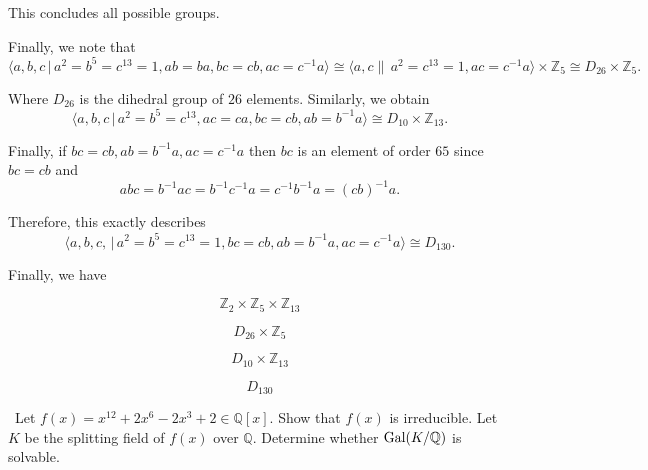 \documentclass[12pt]{Qual}
\begin{document}
\begin{solution}
This concludes all possible groups.

Finally, we note that
    $$\langle a,b,c\,|\,a^2=b^5=c^{13}=1,ab=ba,bc=cb,ac=c^{-1}a\rangle\cong\langle a,c\|\,a^2=c^{13}=1,ac=c^{-1}a\rangle\times\mathbb{Z}_5\cong D_{26}\times\mathbb{Z}_5.$$

    Where $D_{26}$ is the dihedral group of $26$ elements. Similarly, we obtain   $$\langle a,b,c\,|\,a^2=b^5=c^{13},ac=ca,bc=cb,ab=b^{-1}a\rangle\cong D_{10}\times\mathbb{Z}_{13}.$$

    Finally, if $bc=cb,ab=b^{-1}a,ac=c^{-1}a$ then $bc$ is an element of order $65$ since $bc=cb$ and $$abc=b^{-1}ac=b^{-1}c^{-1}a=c^{-1}b^{-1}a=(cb)^{-1}a.$$

    Therefore, this exactly describes $$\langle a,b,c,\,|\,a^2=b^5=c^{13}=1,bc=cb,ab=b^{-1}a,ac=c^{-1}a\rangle\cong D_{130}.$$

    Finally, we have

\begin{center}
    \begin{framed}

    $$\mathbb{Z}_2\times\mathbb{Z}_5\times\mathbb{Z}_{13}$$

    $$D_{26}\times\mathbb{Z}_5$$

    $$D_{10}\times\mathbb{Z}_{13}$$

    $$D_{130}$$

    \end{framed}
\end{center}

\end{solution}
\newpage



\begin{problem} $\,$
Let $f(x)=x^{12}+2x^6-2x^3+2\in\mathbb{Q}[x]$. Show that $f(x)$ is irreducible. Let $K$ be the splitting field of $f(x)$ over $\mathbb{Q}$. Determine whether $\text{Gal}(K/\mathbb{Q})$ is solvable.
\end{problem}
\end{document}
